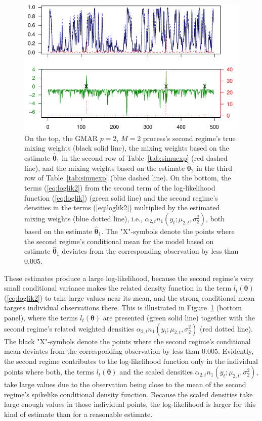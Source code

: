 \documentclass[nojss]{jss} %
\begin{document}
\begin{appendix}
\begin{figure}[p]
  \centering
  \includegraphics{figures/figsimuexp.pdf}
  \caption{On the top, the GMAR $p=2$, $M=2$ process's second regime's true mixing weights (black solid line), the mixing weights based on the estimate $\hat{\boldsymbol{\theta}}_1$ in the second row of Table~\ref{tab:simuexp} (red dashed line), and the mixing weights based on the estimate $\hat{\boldsymbol{\theta}}_2$ in the third row of Table~\ref{tab:simuexp} (blue dashed line). On the bottom, the terms (\ref{eq:loglik2}) from the second term of the log-likelihood function (\ref{eq:loglik}) (green solid line) and the second regime's densities in the terms (\ref{eq:loglik2}) multiplied by the estimated mixing weights (blue dotted line), i.e., $\alpha_{2,t}n_1(y_t;\mu_{2,t},\sigma_2^2)$, both based on the estimate $\hat{\boldsymbol{\theta}}_1$. The "X"-symbols denote the points where the second regime's conditional mean for the model based on estimate $\hat{\boldsymbol{\theta}}_1$ deviates from the corresponding observation by less than $0.005$.}
\label{fig:simuexp}
\end{figure}

These estimates produce a large log-likelihood, because the second regime's very small conditional variance makes the related density function in the term $l_t(\boldsymbol{\theta})$ (\ref{eq:loglik2}) to take large values near its mean, and the strong conditional mean targets individual observations there. This is illustrated in Figure~\ref{fig:simuexp} (bottom panel), where the terms $l_t(\boldsymbol{\theta})$ are presented (green solid line) together with the second regime's related weighted densities $\alpha_{2,t}n_1(y_t;\mu_{2,t},\sigma_2^2)$ (red dotted line). The black "X"-symbols denote the points where the second regime's conditional mean deviates from the corresponding observation by less than $0.005$. Evidently, the second regime contributes to the log-likelihood function only in the individual points where both, the terms $l_t(\boldsymbol{\theta})$ and the scaled densities $\alpha_{2,t}n_1(y_t;\mu_{2,t},\sigma_2^2)$, take large values due to the observation being close to the mean of the second regime's spikelike conditional density function. Because the scaled densities take large enough values in those individual points, the log-likelihood is larger for this kind of estimate than for a reasonable estimate.


\end{appendix}
\end{document}
